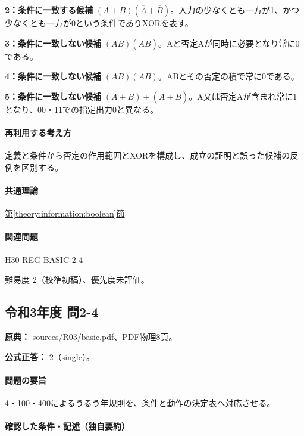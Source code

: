 \noindent\textbf{2：条件に一致する候補} \((A+B)(\overline A+\overline B)\)。入力の少なくとも一方が1、かつ少なくとも一方が0という条件でありXORを表す。\par

\noindent\textbf{3：条件に一致しない候補} \((AB)(\overline A\overline B)\)。Aと否定Aが同時に必要となり常に0である。\par

\noindent\textbf{4：条件に一致しない候補} \((AB)\overline{(AB)}\)。ABとその否定の積で常に0である。\par

\noindent\textbf{5：条件に一致しない候補} \((A+B)+(\overline A+\overline B)\)。A又は否定Aが含まれ常に1となり、00・11での指定出力0と異なる。\par

\paragraph{再利用する考え方} 定義と条件から否定の作用範囲とXORを構成し、成立の証明と誤った候補の反例を区別する。

\paragraph{共通理論} \hyperref[theory:information:boolean]{第\ref*{theory:information:boolean}節}

\paragraph{関連問題} \hyperref[q:h30-reg-basic-2-4]{H30-REG-BASIC-2-4}

\par 難易度 2（校準初稿）、優先度未評価。

\subsection{令和3年度 問2-4}
\label{q:r03-reg-basic-2-4}

\noindent\textbf{原典：} sources/R03/basic.pdf、PDF物理8頁。

\textbf{公式正答：} 2（single）。

\paragraph{問題の要旨} 4・100・400によるうるう年規則を、条件と動作の決定表へ対応させる。

\paragraph{確認した条件・記述（独自要約）}\mbox{}\par

